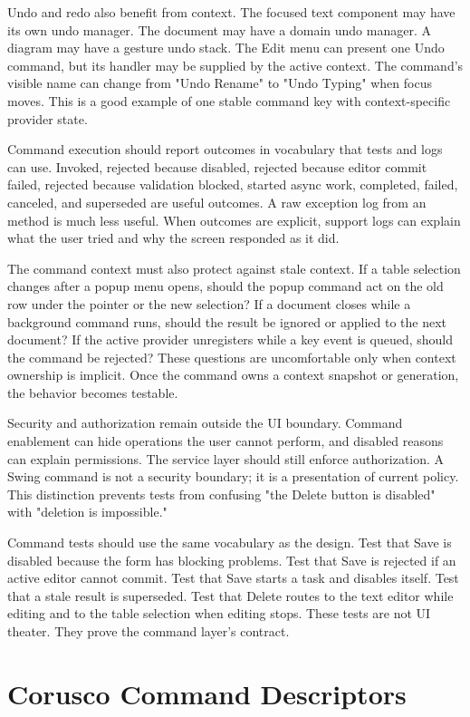 Undo and redo also benefit from context. The focused text component may have
its own undo manager. The document may have a domain undo manager. A diagram
may have a gesture undo stack. The Edit menu can present one Undo command, but
its handler may be supplied by the active context. The command's visible name
can change from "Undo Rename" to "Undo Typing" when focus moves. This is a
good example of one stable command key with context-specific provider state.

Command execution should report outcomes in vocabulary that tests and logs can
use. Invoked, rejected because disabled, rejected because editor commit failed,
rejected because validation blocked, started async work, completed, failed,
canceled, and superseded are useful outcomes. A raw exception log from an
 method is much less useful. When outcomes are explicit,
support logs can explain what the user tried and why the screen responded as it
did.

The command context must also protect against stale context. If a table
selection changes after a popup menu opens, should the popup command act on the
old row under the pointer or the new selection? If a document closes while a
background command runs, should the result be ignored or applied to the next
document? If the active provider unregisters while a key event is queued, should
the command be rejected? These questions are uncomfortable only when context
ownership is implicit. Once the command owns a context snapshot or generation,
the behavior becomes testable.

Security and authorization remain outside the UI boundary. Command enablement
can hide operations the user cannot perform, and disabled reasons can explain
permissions. The service layer should still enforce authorization. A Swing
command is not a security boundary; it is a presentation of current policy. This
distinction prevents tests from confusing "the Delete button is disabled" with
"deletion is impossible."

Command tests should use the same vocabulary as the design. Test that Save is
disabled because the form has blocking problems. Test that Save is rejected if
an active editor cannot commit. Test that Save starts a task and disables
itself. Test that a stale result is superseded. Test that Delete routes to the
text editor while editing and to the table selection when editing stops. These
tests are not UI theater. They prove the command layer's contract.

\section{Corusco Command Descriptors}

